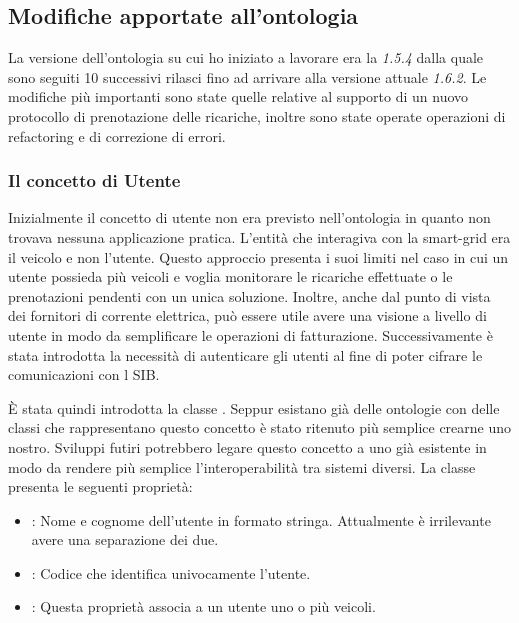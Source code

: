 \subsection{Modifiche apportate all'ontologia}

La versione dell'ontologia su cui ho iniziato a lavorare era la \emph{1.5.4} dalla quale sono seguiti 10 successivi rilasci fino ad arrivare alla versione attuale \emph{1.6.2}. Le modifiche più importanti sono state quelle relative al supporto di un nuovo protocollo di prenotazione delle ricariche, inoltre sono state operate operazioni di refactoring e di correzione di errori.

\subsubsection{Il concetto di Utente}\label{subsubsec:person}

Inizialmente il concetto di utente non era previsto nell'ontologia in quanto non trovava nessuna applicazione pratica.
L'entità che interagiva con la smart-grid era il veicolo e non l'utente. Questo approccio presenta i suoi limiti nel caso in cui un utente possieda più veicoli e voglia monitorare le ricariche effettuate o le prenotazioni pendenti con un unica soluzione. Inoltre, anche dal punto di vista dei fornitori di corrente elettrica, può essere utile avere una visione a livello di utente in modo da semplificare le operazioni di fatturazione. 
Successivamente è stata introdotta la necessità di autenticare gli utenti al fine di poter cifrare le comunicazioni con l SIB. 

È stata quindi introdotta la classe . Seppur esistano già delle ontologie con delle classi che rappresentano questo concetto è stato ritenuto più semplice crearne uno nostro. Sviluppi futiri potrebbero legare questo concetto a uno già esistente in modo da rendere più semplice l'interoperabilità tra sistemi diversi. La classe presenta le seguenti proprietà:

\begin{itemize}
	\item {}: Nome e cognome dell'utente in formato stringa. Attualmente è irrilevante avere una separazione dei due. 
	\item {}: Codice che identifica univocamente l'utente.
	\item {}: Questa proprietà associa a un utente uno o più veicoli.
\end{itemize}

